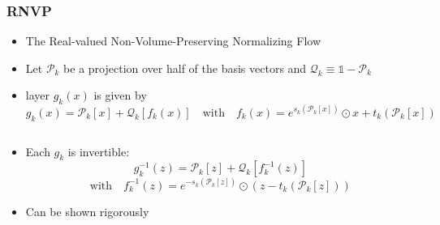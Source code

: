 \begin{frame}
    \frametitle{RNVP}
    \begin{itemize}
        \setlength\itemsep{.6em}
        \item The Real-valued Non-Volume-Preserving Normalizing Flow
        \item Let $\mathcal{P}_k$ be a projection over half of the basis vectors and $\mathcal{Q}_k \equiv \mathbb{1} - \mathcal{P}_k$
        \item layer $g_k(x)$ is given by 
            \begin{equation}
                g_k(x) = \mathcal{P}_k[x] + \mathcal{Q}_k [f_k(x)] \quad \text{with} \quad f_k(x) =  e^{s_k(\mathcal{P}_k[x])} \odot x + t_k(\mathcal{P}_k[x])
                \label{eq:layer_RNVP}
            \end{equation}
    \end{itemize}
    \begin{columns}
        \begin{column}[t]{0.48\textwidth}
            \begin{itemize}
                \item Each $g_k$ is invertible: 
                \[
                    g_k^{-1}(z) = \mathcal{P}_k[z] + \mathcal{Q}_k[f_k^{-1}(z)] 
                \]
                \[ 
                    \text{with} \quad f_k^{-1}(z) =  e^{-s_k(\mathcal{P}_k[z])} \odot (z - t_k(\mathcal{P}_k[z]))
                \]
                \item Can be shown rigorously
            \end{itemize}
        \end{column}


\end{columns}
\end{frame}
